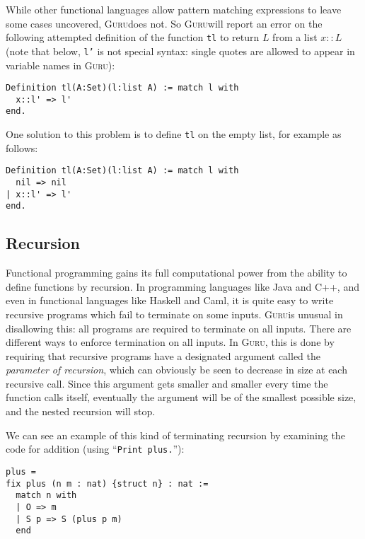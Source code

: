 \documentclass{book}[12pt]
\newcommand{\guru}[0]{\textsc{Guru}}
\begin{document}
While other functional languages allow pattern matching expressions to
leave some cases uncovered, \guru does not.  So \guru will report an error
on the following attempted definition of the function \texttt{tl} to
return $L$ from a list $x::L$ (note that below, \texttt{l'} is not
special syntax: single quotes are allowed to appear in variable
names in \guru):

\begin{verbatim}
Definition tl(A:Set)(l:list A) := match l with
  x::l' => l'
end.
\end{verbatim}

\noindent One solution to this problem is to define \texttt{tl} on
the empty list, for example as follows:

\begin{verbatim}
Definition tl(A:Set)(l:list A) := match l with
  nil => nil
| x::l' => l'
end.
\end{verbatim}

\subsection{Recursion}
\label{sec:rec}

Functional programming gains its full computational power from the
ability to define functions by recursion.  In programming languages
like Java and C++, and even in functional languages like Haskell and
Caml, it is quite easy to write recursive programs which fail to
terminate on some inputs.  \guru is unusual in disallowing this: all
programs are required to terminate on all inputs.  There are different
ways to enforce termination on all inputs.  In \guru, this is done by
requiring that recursive programs have a designated argument called
the \emph{parameter of recursion}, which can obviously be seen to
decrease in size at each recursive call.  Since this argument gets
smaller and smaller every time the function calls itself, eventually
the argument will be of the smallest possible size, and the nested
recursion will stop.

We can see an example of this kind of terminating recursion by
examining the code for addition (using ``\texttt{Print plus.}''):

\begin{verbatim}
plus = 
fix plus (n m : nat) {struct n} : nat :=
  match n with
  | O => m
  | S p => S (plus p m)
  end
\end{verbatim}
\end{document}
